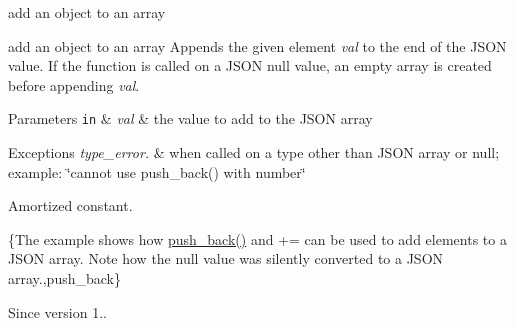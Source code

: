 add an object to an array 

add an object to an array Appends the given element {\itshape val} to the end of the J\+S\+ON value. If the function is called on a J\+S\+ON null value, an empty array is created before appending {\itshape val}.


\begin{DoxyParams}[1]{Parameters}
\mbox{\tt in}  & {\em val} & the value to add to the J\+S\+ON array\\
\hline
\end{DoxyParams}

\begin{DoxyExceptions}{Exceptions}
{\em type\+\_\+error.} & when called on a type other than J\+S\+ON array or null; example\+: {\ttfamily \char`\"{}cannot use push\+\_\+back() with number\char`\"{}}\\
\hline
\end{DoxyExceptions}
Amortized constant.

\{The example shows how {\ttfamily \mbox{\hyperlink{classnlohmann_1_1basic__json_ac8e523ddc8c2dd7e5d2daf0d49a9c0d7}{push\+\_\+back()}}} and {\ttfamily +=} can be used to add elements to a J\+S\+ON array. Note how the {\ttfamily null} value was silently converted to a J\+S\+ON array.,push\+\_\+back\}

\begin{DoxySince}{Since}
version 1.. 
\end{DoxySince}
\mbox{\label{classnlohmann_1_1basic__json_abf04978d85a2d5c4754f4806d42f46fd}} 
